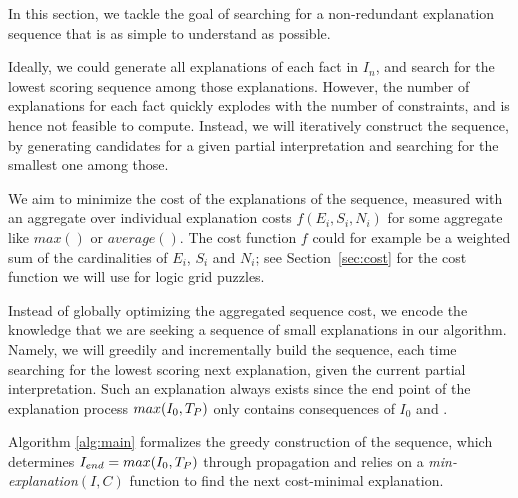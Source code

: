 In this section, we tackle the goal of searching for a non-redundant explanation sequence that is as simple to understand as possible. 

Ideally, we could generate all explanations of each fact in $I_n$, and search for the lowest scoring sequence among those explanations. However, the number of explanations for each fact quickly explodes with the number of constraints, and is hence not feasible to compute. Instead, we will iteratively construct the sequence, by generating candidates for a given partial interpretation and searching for the smallest one among those.

We aim to minimize the cost of the explanations of the sequence, measured with an aggregate over individual explanation costs $f(E_i, S_i, N_i)$ for some aggregate like $max()$ or $average()$. The cost function $f$ could for example be a weighted sum of the cardinalities of $E_i$, $S_i$ and $N_i$; see Section~\ref{sec:cost} for the cost function we will use for logic grid puzzles.

Instead of globally optimizing the aggregated sequence cost, we encode the knowledge that we are seeking a sequence of small explanations in our algorithm. Namely, we will greedily and incrementally build the sequence, each time searching for the lowest scoring next explanation, given the current partial interpretation. Such an explanation always exists since the end point of the explanation process $max(I_0,T_P)$ only contains consequences of $I_0$ and \allconstraints. 

Algorithm \ref{alg:main} formalizes the greedy construction of the sequence, which determines $I_{end} = max(I_0,T_P)$  through propagation and relies on a \textit{min-explanation$(I,C)$} function to find the next cost-minimal explanation. %

